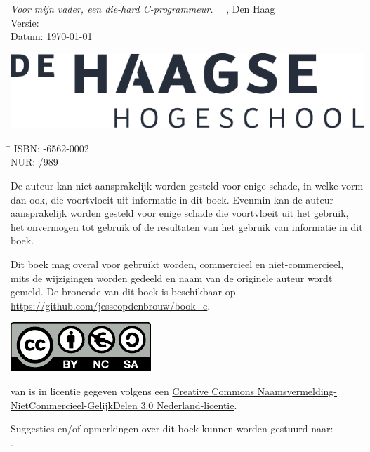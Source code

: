 \maketitle

\hspace*{0em}
\vfill
\textsl{Voor mijn vader, een die-hard C-programmeur.}
\vfill
\textcopyright\the\year\ \ \bookauthor, Den Haag\\
Versie: \bookversion\\
Datum: \today

\vspace*{.25cm}
\ifusebookasbook\else
\includegraphics[scale=0.5]{images/HHS_NL_grijs_FC}
\fi

\ifusebookasbook
\vspace*{1cm}
\begin{tabbing}
\hspace{1.2cm}\=\kill
 ISBN: -6562-0002 \\ 
 NUR:  /989
\end{tabbing}
\fi

\vspace*{1cm}
De auteur kan niet aansprakelijk worden gesteld voor enige schade, in welke vorm dan
ook, die voortvloeit uit informatie in dit boek. Evenmin kan de auteur aansprakelijk
worden gesteld voor enige schade die voortvloeit uit het gebruik, het onvermogen tot
gebruik of de resultaten van het gebruik van informatie in dit boek.

\vspace*{0.5cm}
Dit boek mag overal voor gebruikt worden, commercieel en niet-commercieel, mits de
wijzigingen worden gedeeld en naam van de originele auteur wordt gemeld. De broncode
van dit boek is beschikbaar op \url{https://github.com/jesseopdenbrouw/book_c}.


\vspace*{2cm}
\includegraphics{images/by-nc-sa_eu.pdf}
\par
{\small%
\booktitle{} van \bookauthor{} is in licentie gegeven volgens
een \href{http://creativecommons.org/licenses/by-nc-sa/3.0/nl/}{Creative Commons
Naamsvermelding-NietCommercieel-GelijkDelen 3.0 Nederland-licentie}.

Suggesties en/of opmerkingen over dit boek kunnen worden gestuurd naar:\\
\href{mailto:\email}{\email}.}
